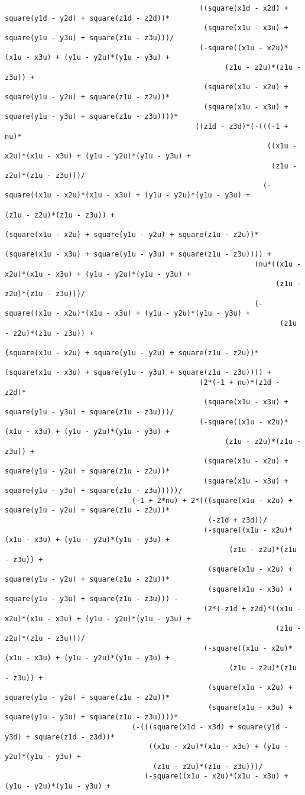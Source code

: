 \begin{lstlisting}
											  ((square(x1d - x2d) + square(y1d - y2d) + square(z1d - z2d))*
											   (square(x1u - x3u) + square(y1u - y3u) + square(z1u - z3u)))/
											  (-square((x1u - x2u)*(x1u - x3u) + (y1u - y2u)*(y1u - y3u) + 
													(z1u - z2u)*(z1u - z3u)) + 
											   (square(x1u - x2u) + square(y1u - y2u) + square(z1u - z2u))*
											   (square(x1u - x3u) + square(y1u - y3u) + square(z1u - z3u))))*
											 ((z1d - z3d)*(-(((-1 + nu)*
															  ((x1u - x2u)*(x1u - x3u) + (y1u - y2u)*(y1u - y3u) + 
															   (z1u - z2u)*(z1u - z3u)))/
															 (-square((x1u - x2u)*(x1u - x3u) + (y1u - y2u)*(y1u - y3u) + 
																   (z1u - z2u)*(z1u - z3u)) + 
															  (square(x1u - x2u) + square(y1u - y2u) + square(z1u - z2u))*
															  (square(x1u - x3u) + square(y1u - y3u) + square(z1u - z3u)))) + 
														   (nu*((x1u - x2u)*(x1u - x3u) + (y1u - y2u)*(y1u - y3u) + 
																(z1u - z2u)*(z1u - z3u)))/
														   (-square((x1u - x2u)*(x1u - x3u) + (y1u - y2u)*(y1u - y3u) + 
																 (z1u - z2u)*(z1u - z3u)) + 
															(square(x1u - x2u) + square(y1u - y2u) + square(z1u - z2u))*
															(square(x1u - x3u) + square(y1u - y3u) + square(z1u - z3u)))) + 
											  (2*(-1 + nu)*(z1d - z2d)*
											   (square(x1u - x3u) + square(y1u - y3u) + square(z1u - z3u)))/
											  (-square((x1u - x2u)*(x1u - x3u) + (y1u - y2u)*(y1u - y3u) + 
													(z1u - z2u)*(z1u - z3u)) + 
											   (square(x1u - x2u) + square(y1u - y2u) + square(z1u - z2u))*
											   (square(x1u - x3u) + square(y1u - y3u) + square(z1u - z3u)))))/
							  (-1 + 2*nu) + 2*(((square(x1u - x2u) + square(y1u - y2u) + square(z1u - z2u))*
												(-z1d + z3d))/
											   (-square((x1u - x2u)*(x1u - x3u) + (y1u - y2u)*(y1u - y3u) + 
													 (z1u - z2u)*(z1u - z3u)) + 
												(square(x1u - x2u) + square(y1u - y2u) + square(z1u - z2u))*
												(square(x1u - x3u) + square(y1u - y3u) + square(z1u - z3u))) - 
											   (2*(-z1d + z2d)*((x1u - x2u)*(x1u - x3u) + (y1u - y2u)*(y1u - y3u) + 
																(z1u - z2u)*(z1u - z3u)))/
											   (-square((x1u - x2u)*(x1u - x3u) + (y1u - y2u)*(y1u - y3u) + 
													 (z1u - z2u)*(z1u - z3u)) + 
												(square(x1u - x2u) + square(y1u - y2u) + square(z1u - z2u))*
												(square(x1u - x3u) + square(y1u - y3u) + square(z1u - z3u))))*
							  (-(((square(x1d - x3d) + square(y1d - y3d) + square(z1d - z3d))*
								  ((x1u - x2u)*(x1u - x3u) + (y1u - y2u)*(y1u - y3u) + 
								   (z1u - z2u)*(z1u - z3u)))/
								 (-square((x1u - x2u)*(x1u - x3u) + (y1u - y2u)*(y1u - y3u) + 

\end{lstlisting}

